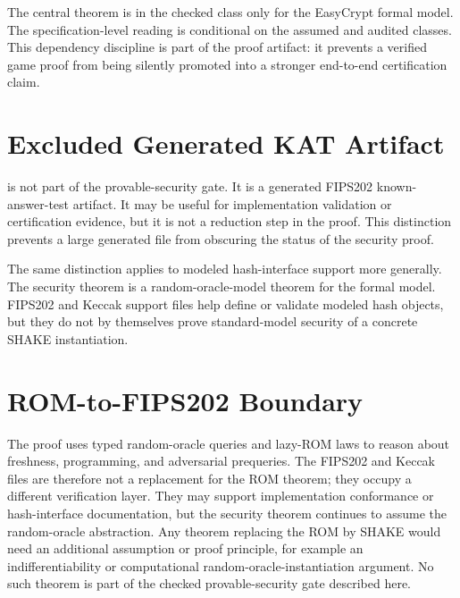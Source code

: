 The central theorem is in the checked class only for the EasyCrypt formal model.
The specification-level reading is conditional on the assumed and audited
classes.  This dependency discipline is part of the proof artifact: it prevents
a verified game proof from being silently promoted into a stronger end-to-end
certification claim.

\section{Excluded Generated KAT Artifact}

 is not part of the
provable-security gate.  It is a generated FIPS202 known-answer-test artifact.
It may be useful for implementation validation or certification evidence, but
it is not a reduction step in the \eufcma{} proof.  This distinction prevents a
large generated file from obscuring the status of the security proof.

The same distinction applies to modeled hash-interface support more generally.  The
security theorem is a random-oracle-model theorem for the formal model.  FIPS202
and Keccak support files help define or validate modeled hash objects, but they
do not by themselves prove standard-model security of a concrete SHAKE
instantiation.

\section{ROM-to-FIPS202 Boundary}

The proof uses typed random-oracle queries and lazy-ROM laws to reason about
freshness, programming, and adversarial prequeries.  The FIPS202 and Keccak
files are therefore not a replacement for the ROM theorem; they occupy a
different verification layer.  They may support implementation conformance or
hash-interface documentation, but the security theorem continues to assume the
random-oracle abstraction.  Any theorem replacing the ROM by SHAKE would need an
additional assumption or proof principle, for example an indifferentiability or
computational random-oracle-instantiation argument.  No such theorem is part of
the checked provable-security gate described here.
